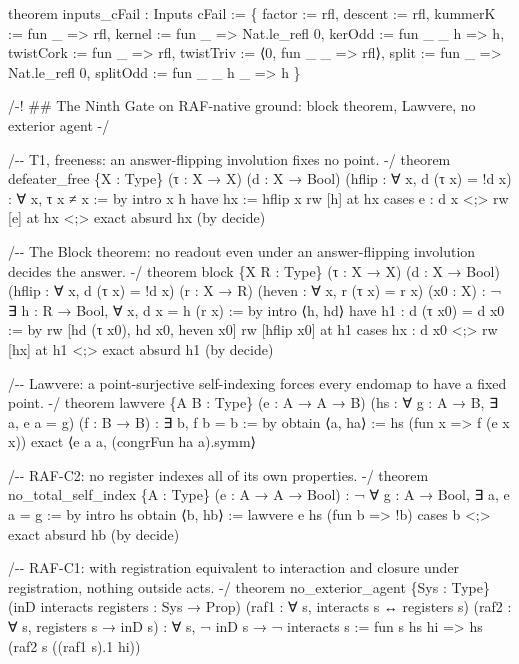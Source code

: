 \documentclass[10pt,twocolumn]{article}
\newenvironment{Shaded}{}{}
\newcommand{\NormalTok}[1]{#1}
\providecommand{\NormalTok}[1]{#1}
\providecommand{\NormalTok}[1]{#1}
\begin{document}
\begin{strip}
\begin{Shaded}
\begin{Highlighting}[]
\NormalTok{theorem inputs\_cFail : Inputs cFail :=}
\NormalTok{  \{ factor := rfl, descent := rfl, kummerK := fun \_ =\textgreater{} rfl, kernel := fun \_ =\textgreater{} Nat.le\_refl 0,}
\NormalTok{    kerOdd := fun \_ \_ h =\textgreater{} h, twistCork := fun \_ =\textgreater{} rfl, twistTriv := ⟨0, fun \_ \_ =\textgreater{} rfl⟩,}
\NormalTok{    split := fun \_ =\textgreater{} Nat.le\_refl 0, splitOdd := fun \_ \_ h \_ =\textgreater{} h \}}

\NormalTok{/{-}! \#\# The Ninth Gate on RAF{-}native ground: block theorem, Lawvere, no exterior agent {-}/}

\NormalTok{/{-}{-} T1, freeness: an answer{-}flipping involution fixes no point. {-}/}
\NormalTok{theorem defeater\_free \{X : Type\} (τ : X → X) (d : X → Bool) (hflip : ∀ x, d (τ x) = !d x) : ∀ x, τ x ≠ x := by}
\NormalTok{  intro x h}
\NormalTok{  have hx := hflip x}
\NormalTok{  rw [h] at hx}
\NormalTok{  cases e : d x \textless{};\textgreater{} rw [e] at hx \textless{};\textgreater{} exact absurd hx (by decide)}

\NormalTok{/{-}{-} The Block theorem: no readout even under an answer{-}flipping involution decides the answer. {-}/}
\NormalTok{theorem block \{X R : Type\} (τ : X → X) (d : X → Bool) (hflip : ∀ x, d (τ x) = !d x)}
\NormalTok{    (r : X → R) (heven : ∀ x, r (τ x) = r x) (x0 : X) : ¬ ∃ h : R → Bool, ∀ x, d x = h (r x) := by}
\NormalTok{  intro ⟨h, hd⟩}
\NormalTok{  have h1 : d (τ x0) = d x0 := by rw [hd (τ x0), hd x0, heven x0]}
\NormalTok{  rw [hflip x0] at h1}
\NormalTok{  cases hx : d x0 \textless{};\textgreater{} rw [hx] at h1 \textless{};\textgreater{} exact absurd h1 (by decide)}

\NormalTok{/{-}{-} Lawvere: a point{-}surjective self{-}indexing forces every endomap to have a fixed point. {-}/}
\NormalTok{theorem lawvere \{A B : Type\} (e : A → A → B) (hs : ∀ g : A → B, ∃ a, e a = g) (f : B → B) : ∃ b, f b = b := by}
\NormalTok{  obtain ⟨a, ha⟩ := hs (fun x =\textgreater{} f (e x x))}
\NormalTok{  exact ⟨e a a, (congrFun ha a).symm⟩}

\NormalTok{/{-}{-} RAF{-}C2: no register indexes all of its own properties. {-}/}
\NormalTok{theorem no\_total\_self\_index \{A : Type\} (e : A → A → Bool) : ¬ ∀ g : A → Bool, ∃ a, e a = g := by}
\NormalTok{  intro hs}
\NormalTok{  obtain ⟨b, hb⟩ := lawvere e hs (fun b =\textgreater{} !b)}
\NormalTok{  cases b \textless{};\textgreater{} exact absurd hb (by decide)}

\NormalTok{/{-}{-} RAF{-}C1: with registration equivalent to interaction and closure under registration, nothing outside acts. {-}/}
\NormalTok{theorem no\_exterior\_agent \{Sys : Type\} (inD interacts registers : Sys → Prop)}
\NormalTok{    (raf1 : ∀ s, interacts s ↔ registers s) (raf2 : ∀ s, registers s → inD s) :}
\NormalTok{    ∀ s, ¬ inD s → ¬ interacts s :=}
\NormalTok{  fun s hs hi =\textgreater{} hs (raf2 s ((raf1 s).1 hi))}


\end{Highlighting}
\end{Shaded}
\end{strip}
\end{document}
